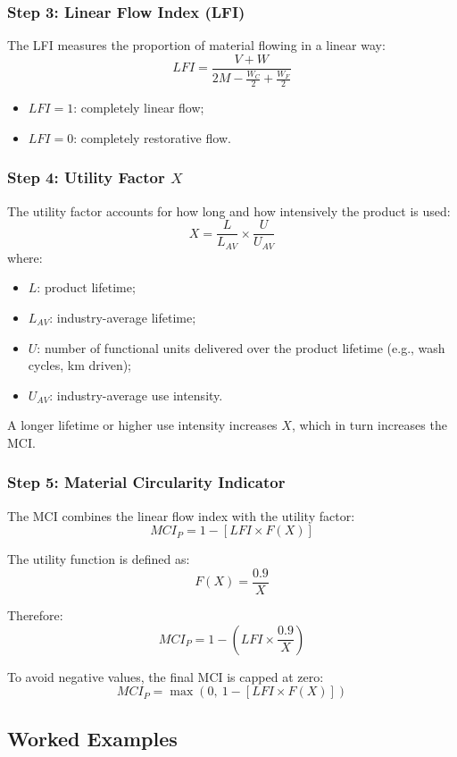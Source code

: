\documentclass{NoteThesis/note-thesis}
\begin{document}
\subsubsection{Step 3: Linear Flow Index (LFI)}

The LFI measures the proportion of material flowing in a linear way:
\[
    LFI = \frac{V + W}{2M - \frac{W_C}{2} + \frac{W_F}{2}}
\]
\begin{itemize}
    \item $LFI = 1$: completely linear flow;
    \item $LFI = 0$: completely restorative flow.
\end{itemize}

\subsubsection{Step 4: Utility Factor $X$}

The utility factor accounts for how long and how intensively the product is used:
\[
    X = \frac{L}{L_{AV}} \times \frac{U}{U_{AV}}
\]
where:
\begin{itemize}
    \item $L$: product lifetime;
    \item $L_{AV}$: industry-average lifetime;
    \item $U$: number of functional units delivered over the product lifetime (e.g., wash cycles, km driven);
    \item $U_{AV}$: industry-average use intensity.
\end{itemize}

A longer lifetime or higher use intensity increases $X$, which in turn increases the MCI.

\subsubsection{Step 5: Material Circularity Indicator}

The MCI combines the linear flow index with the utility factor:
\[
    MCI_P = 1 - \left[ LFI \times F(X) \right]
\]

The utility function is defined as:
\[
    F(X) = \frac{0.9}{X}
\]

Therefore:
\[
    MCI_P = 1 - \left( LFI \times \frac{0.9}{X} \right)
\]

To avoid negative values, the final MCI is capped at zero:
\[
    MCI_P = \max(0,\ 1 - [LFI \times F(X)])
\]

\subsection{Worked Examples}
\end{document}
